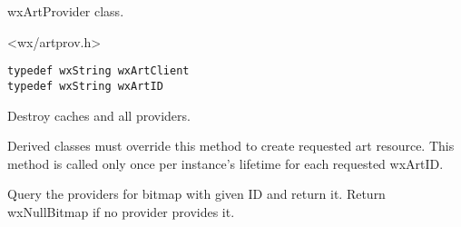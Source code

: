 %
%

\section{}\label{wxartprovider}

wxArtProvider class.




<wx/artprov.h>


{\small \begin{verbatim}
typedef wxString wxArtClient
typedef wxString wxArtID
\end{verbatim}}


\label{wxartprovidercleanupproviders}


Destroy caches and all providers.

\label{wxartprovidercreatebitmap}


Derived classes must override this method to create requested 
art resource. This method is called only once per instance's
lifetime for each requested wxArtID.

\label{wxartprovidergetbitmap}


Query the providers for bitmap with given ID and return it. Return
wxNullBitmap if no provider provides it.

\label{wxartprovidergeticon}


